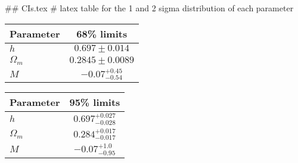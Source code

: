## CIs.tex
# latex table for the 1 and 2 sigma distribution of each parameter

\begin{tabular} { l  c}
 Parameter &  68\% limits\\
\hline
{\boldmath$h              $} & $0.697\pm 0.014            $\\
{\boldmath$\Omega_m       $} & $0.2845\pm 0.0089          $\\
{\boldmath$M              $} & $-0.07^{+0.45}_{-0.54}     $\\
\hline
\end{tabular}

\begin{tabular} { l  c}
 Parameter &  95\% limits\\
\hline
{\boldmath$h              $} & $0.697^{+0.027}_{-0.028}   $\\
{\boldmath$\Omega_m       $} & $0.284^{+0.017}_{-0.017}   $\\
{\boldmath$M              $} & $-0.07^{+1.0}_{-0.95}      $\\
\hline
\end{tabular}
